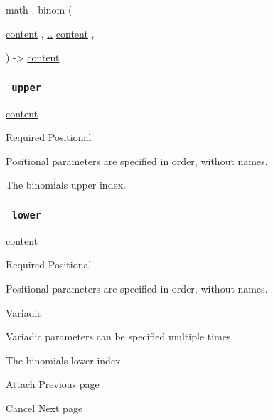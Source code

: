 math { . } { binom } (

{ \href{/docs/reference/foundations/content/}{content} , } {
\hyperref[parameters-lower]{..}
\href{/docs/reference/foundations/content/}{content} , }

) -\textgreater{} \href{/docs/reference/foundations/content/}{content}

\subsubsection{\texorpdfstring{\texttt{\ upper\ }}{ upper }}\label{parameters-upper}

\href{/docs/reference/foundations/content/}{content}

{Required} {{ Positional }}

\label{parameters-upper-positional-tooltip}
Positional parameters are specified in order, without names.

The binomial\textquotesingle s upper index.

\subsubsection{\texorpdfstring{\texttt{\ lower\ }}{ lower }}\label{parameters-lower}

\href{/docs/reference/foundations/content/}{content}

{Required} {{ Positional }}

\label{parameters-lower-positional-tooltip}
Positional parameters are specified in order, without names.

{{ Variadic }}

\label{parameters-lower-variadic-tooltip}
Variadic parameters can be specified multiple times.

The binomial\textquotesingle s lower index.

\href{/docs/reference/math/attach/}{\pandocbounded{}}

{ Attach } { Previous page }

\href{/docs/reference/math/cancel/}{\pandocbounded{}}

{ Cancel } { Next page }
